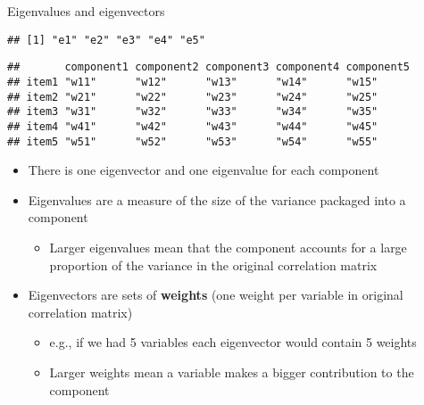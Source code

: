 \documentclass[
  ignorenonframetext,
]{beamer}
\providecommand{\tightlist}{%
  \setlength{\itemsep}{0pt}\setlength{\parskip}{0pt}}
\begin{document}
\begin{frame}[fragile]{Eigenvalues and eigenvectors}
\protect\hypertarget{eigenvalues-and-eigenvectors}{}

\begin{verbatim}
## [1] "e1" "e2" "e3" "e4" "e5"
\end{verbatim}

\begin{verbatim}
##       component1 component2 component3 component4 component5
## item1 "w11"      "w12"      "w13"      "w14"      "w15"     
## item2 "w21"      "w22"      "w23"      "w24"      "w25"     
## item3 "w31"      "w32"      "w33"      "w34"      "w35"     
## item4 "w41"      "w42"      "w43"      "w44"      "w45"     
## item5 "w51"      "w52"      "w53"      "w54"      "w55"
\end{verbatim}

\begin{itemize}
\tightlist
\item
  There is one eigenvector and one eigenvalue for each component
\item
  Eigenvalues are a measure of the size of the variance packaged into a
  component

  \begin{itemize}
  \tightlist
  \item
    Larger eigenvalues mean that the component accounts for a large
    proportion of the variance in the original correlation matrix
  \end{itemize}
\item
  Eigenvectors are sets of \textbf{weights} (one weight per variable in
  original correlation matrix)

  \begin{itemize}
  \tightlist
  \item
    e.g., if we had 5 variables each eigenvector would contain 5 weights
  \item
    Larger weights mean a variable makes a bigger contribution to the
    component
  \end{itemize}
\end{itemize}

\end{frame}
\end{document}

